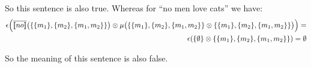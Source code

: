 \noindent
So this sentence is also true. Whereas for ``no men love cats'' we have:
\begin{align*}
\epsilon\Big(\overline{[\![ no ]\!]} \big(\{\{m_1\}, \{m_2\}, \{m_1, m_2\}\}\big) \otimes  \mu \big(\{\{m_1\}, \{m_2\}, \{m_1, m_2\}\} \otimes \{\{m_1\}, \{m_2\}, \{m_1, m_2\}\}\big)\Big)=\\
\epsilon(\{\emptyset\} \otimes  \{\{m_1\}, \{m_2\}, \{m_1, m_2\}\}) =\emptyset
\end{align*}

\noindent
So the meaning of this sentence is also false.  







